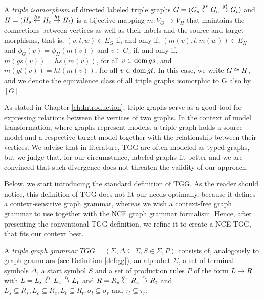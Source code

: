 \begin{definition}
	A \emph{triple isomorphism} of directed labeled triple graphs $G = (G_s \overset{gs}{\leftarrow} G_c \overset{gt}{\rightarrow} G_t)$ and $H = (H_s \overset{hs}{\leftarrow} H_c \overset{ht}{\rightarrow} H_t)$ is a bijective mapping $m: V_G \to V_H$ that maintains the connections between vertices as well as their labels and the source and target morphisms, that is, $(v,l,w) \in E_G$ if, and only if, $(m(v),l,m(w)) \in E_H$ and $\phi_G(v) = \phi_H(m(v))$ and $v \in G_c$ if, and only if, $m(gs(v)) = hs(m(v))$, for all $v \in \operatorname{dom} gs$, and $m(gt(v)) = ht(m(v))$, for all $v \in \operatorname{dom} gt$. In this case, we write $G \cong H$, and we denote the equivalence class of all triple graphs isomorphic to G also by $[G]$.
\end{definition}

As stated in Chapter \ref{ch:Introduction}, triple graphs serve as a good tool for expressing relations between the vertices of two graphs. In the context of model transformation, where graphs represent models, a triple graph holds a source model and a respective target model together with the relationship between their vertices. We advise that in literature, TGG are often modeled as typed graphs, but we judge that, for our circumstance, labeled graphs fit better and we are convinced that such divergence does not threaten the validity of our approach.

Below, we start introducing the standard definition of TGG. As the reader should notice, this definition of TGG does not fit our needs optimally, because it defines a context-sensitive graph grammar, whereas we wish a context-free graph grammar to use together with the NCE graph grammar formalism. Hence, after presenting the conventional TGG definition, we refine it to create a NCE TGG, that fits our context best.

\begin{definition}
	\label{def:stgg}
	A \emph{triple graph grammar} $TGG = (\Sigma, \Delta \subseteq \Sigma, S \in \Sigma, P)$ consists of, analogously to graph grammars (see Definition \ref{def:gg}), an alphabet $\Sigma$, a set of terminal symbols $\Delta$, a start symbol $S$ and a set of production rules $P$ of the form $L \to R$ with $L = L_s \overset{\sigma_l}{\leftarrow} L_c \overset{\tau_l}{\rightarrow} L_t$ and $R = R_s \overset{\sigma_r}{\leftarrow} R_c \overset{\tau_r}{\rightarrow} R_t$  and $L_s \subseteq R_s, L_c \subseteq R_c, L_t \subseteq R_t, \sigma_l \subseteq \sigma_r$ and $\tau_l \subseteq \tau_r$.
\end{definition}

